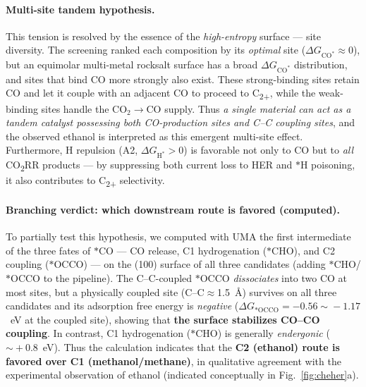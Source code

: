 \documentclass[11pt,a4paper]{report}
\newcommand{\dGCO}{\Delta G_{\mathrm{CO^*}}}
\newcommand{\dGH}{\Delta G_{\mathrm{H^*}}}
\begin{document}
\paragraph{Multi-site tandem hypothesis.} This tension is resolved by the essence of the \emph{high-entropy} surface
--- site diversity. The screening ranked each composition by its \emph{optimal} site ($\dGCO\!\approx\!0$), but an
equimolar multi-metal rocksalt surface has a broad $\dGCO$ distribution, and sites that bind CO more strongly also
exist. These strong-binding sites retain CO and let it couple with an adjacent CO to proceed to C\textsubscript{2+},
while the weak-binding sites handle the CO$_2\!\to\!$CO supply. Thus \emph{a single material can act as a tandem
catalyst possessing both CO-production sites and C--C coupling sites}, and the observed ethanol is interpreted as this
emergent multi-site effect. Furthermore, H repulsion (A2, $\dGH>0$) is favorable not only to CO but to \emph{all}
CO\textsubscript{2}RR products --- by suppressing both current loss to HER and $*$H poisoning, it also contributes to
C\textsubscript{2+} selectivity.

\paragraph{Branching verdict: which downstream route is favored (computed).} To partially test this hypothesis, we
computed with UMA the first intermediate of the three fates of $*$CO --- CO release, C1 hydrogenation ($*$CHO), and
C2 coupling ($*$OCCO) --- on the (100) surface of all three candidates (adding $*$CHO/$*$OCCO to the pipeline).
The C--C-coupled $*$OCCO \emph{dissociates} into two CO at most sites, but a physically coupled site
(C--C$\approx$1.5~\AA) survives on all three candidates and its adsorption free energy is \emph{negative}
($\Delta G_{*\mathrm{OCCO}}=-0.56\!\sim\!-1.17$~eV at the coupled site), showing that \textbf{the surface stabilizes
CO--CO coupling}. In contrast, C1 hydrogenation ($*$CHO) is generally \emph{endergonic} ($\sim\!+0.8$~eV). Thus the
calculation indicates that the \textbf{C2 (ethanol) route is favored over C1 (methanol/methane)}, in qualitative
agreement with the experimental observation of ethanol (indicated conceptually in Fig.~\ref{fig:cheher}a).
\end{document}
